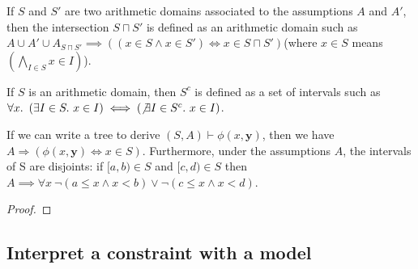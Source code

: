 \documentclass[]{article}
\begin{document}
\vspace{3mm}

\begin{definition}

If $S$ and $S'$ are two arithmetic domains associated to the
assumptions $A$ and $A'$, then the intersection $S\sqcap S'$ is
defined as an arithmetic domain such as\newline
$A \cup A' \cup A_{S\sqcap S'} \implies \left(\left(x \in S \land x \in S'\right)\iff x \in S \sqcap S'\right)$\newline (where
$x \in S$ means $\left(\bigwedge\limits_{I\in S} x \in I\right)$).

\label{domains}

\end{definition}

\vspace{3mm}

\begin{definition}

If $S$ is an arithmetic domain, then $S^c$ is defined as a set of
intervals such as
$\forall x.\ \left( \exists I \in S.\ x \in I\right) \iff \left( \not\exists I \in S^c.\ x \in I\right)$.

\label{complementary}

\end{definition}

\vspace{3mm}

\begin{lemma}[]

If we can write a tree to derive $(S, A) \vdash \phi(x, \mathbf{y})$,
then we have
$A \Rightarrow \left(\phi(x, \mathbf{y}) \iff x \in S\right)$.
Furthermore, under the assumptions $A$, the intervals of S are
disjoints: \newline
if $[a, b) \in S$ and $[c, d) \in S$ then
$A \implies \forall x\ \lnot \left( a \leq x \land x < b\right) \lor \lnot \left( c \leq x \land x < d \right)$.

\label{}

\end{lemma}

\begin{proof}
\end{proof}

\subsection{Interpret a constraint with a
model}\label{interpret-a-constraint-with-a-model}
\end{document}
